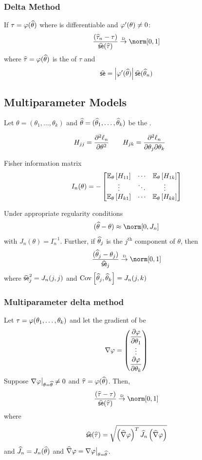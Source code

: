 \documentclass[landscape]{article}
\begin{document}
\begin{multicols*}{2}
\subsubsection{Delta Method}
If $\tau=\transform(\that)$
where \transform is differentiable and $\transform'(\theta) \neq 0$:
\[\frac{(\widehat{\tau}_n-\tau)}{\sehat(\widehat{\tau})} \dconv \norm[0,1]\]
where $\widehat{\tau} = \transform(\that)$
is the \mle of $\tau$ and
\[\sehat = \left|\transform'(\that)\right|\sehat(\that_n)\]

\subsection{Multiparameter Models}

Let $\theta=(\theta_1,\dots,\theta_k)$
and $\that= (\that_1,\dots,\that_k)$ be the \mle.

\[H_{jj} = \frac{\partial^2 \lln}{\partial\theta^2} \qquad
H_{jk} = \frac{\partial^2 \lln}{\partial\theta_j\partial\theta_k} \qquad\]

Fisher information matrix
\[I_n(\theta) = -\begin{bmatrix}
  \E[\theta]{H_{11}} & \cdots & \E[\theta]{H_{1k}} \\
  \vdots & \ddots & \vdots \\
  \E[\theta]{H_{k1}} & \cdots & \E[\theta]{H_{kk}}
\end{bmatrix}\]

Under appropriate regularity conditions
\[(\that-\theta) \approx \norm[0,J_n]\]
with $J_n(\theta) = I_n^{-1}$.
Further, if $\that_j$ is the $j^{\mathrm{th}}$ component of $\theta$, then
\[\frac{(\that_j-\theta_j)}{\sehat_j} \dconv \norm[0,1]\] where $\sehat_j^2 =
J_n(j,j)$ and $\cov{\that_j,\that_k} = J_n(j,k)$

\subsubsection{Multiparameter delta method}

Let $\tau = \transform(\theta_1,\dots,\theta_k)$
and let the gradient of \transform be
\[\nabla\transform = \begin{pmatrix}
  \displaystyle\frac{\partial\transform}{\partial\theta_1} \\
  \vdots \\
  \displaystyle\frac{\partial\transform}{\partial\theta_k} \\
\end{pmatrix}\]
Suppose $\bigl.\nabla\transform\bigr|_{\theta=\that} \neq 0$ and
$\widehat{\tau} = \transform(\that)$. Then,
\[\frac{(\widehat{\tau}-\tau)}{\sehat(\widehat{\tau})} \dconv \norm[0,1]\]
where
\[\sehat(\widehat{\tau}) = \sqrt{\left( \widehat{\nabla}\transform \right)^T
\widehat{J}_n\left( \widehat{\nabla}\transform \right)}\]
and $\widehat{J}_n = J_n(\that)$ and $\widehat{\nabla}\transform =
\bigl.\nabla\transform\bigr|_{\theta=\that}$.


\end{multicols*}
\end{document}
